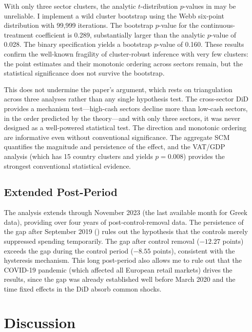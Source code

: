 \documentclass[12pt]{article}
\begin{document}
With only three sector clusters, the analytic $t$-distribution $p$-values in  may be unreliable. I implement a wild cluster bootstrap using the Webb six-point distribution \citep{cameron2008bootstrap} with 99{,}999 iterations. The bootstrap $p$-value for the continuous-treatment coefficient is 0.289, substantially larger than the analytic $p$-value of 0.028. The binary specification yields a bootstrap $p$-value of 0.160. These results confirm the well-known fragility of cluster-robust inference with very few clusters: the point estimates and their monotonic ordering across sectors remain, but the statistical significance does not survive the bootstrap.

This does not undermine the paper's argument, which rests on triangulation across three analyses rather than any single hypothesis test. The cross-sector DiD provides a mechanism test---high-cash sectors decline more than low-cash sectors, in the order predicted by the theory---and with only three sectors, it was never designed as a well-powered statistical test. The direction and monotonic ordering are informative even without conventional significance. The aggregate SCM quantifies the magnitude and persistence of the effect, and the VAT/GDP analysis (which has 15 country clusters and yields $p = 0.008$) provides the strongest conventional statistical evidence.

\subsection{Extended Post-Period}

The analysis extends through November 2023 (the last available month for Greek data), providing over four years of post-control-removal data. The persistence of the gap after September 2019 () rules out the hypothesis that the controls merely suppressed spending temporarily. The gap after control removal ($-12.27$ points) exceeds the gap during the control period ($-8.55$ points), consistent with the hysteresis mechanism. This long post-period also allows me to rule out that the COVID-19 pandemic (which affected all European retail markets) drives the results, since the gap was already established well before March 2020 and the time fixed effects in the DiD absorb common shocks.


\section{Discussion}
\label{sec:discussion}
\end{document}
